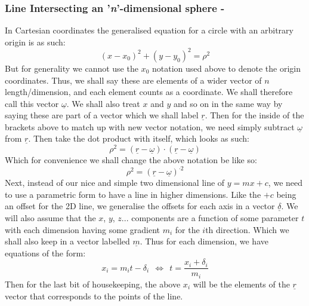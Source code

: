 \documentclass[a4paper,10pt]{article}
\begin{document}
\subsubsection{Line Intersecting an '\textit{n}'-dimensional sphere -}
In Cartesian coordinates the generalised equation for a circle with an arbitrary origin is as such:
\begin{equation}
\left( x - x_0 \right)^2 + \left( y - y_0 \right)^2 = \rho^2
\end{equation}
But for generality we cannot use the $x_0$ notation used above to denote the origin coordinates. Thus, we shall say these are elements of a wider vector of $n$ length/dimension, and each element counts as a coordinate. We shall therefore call this vector $\underline{\omega}$. We shall also treat $x$ and $y$ and so on in the same way by saying these are part of a vector which we shall label $\underline{r}$. Then for the inside of the brackets above to match up with new vector notation, we need simply subtract $\underline{\omega}$ from $\underline{r}$. Then take the dot product with itself, which looks as such:
\begin{equation}
\rho^2 = (\underline{r}-\underline{\omega}) \cdot (\underline{r}-\underline{\omega})
\end{equation}
Which for convenience we shall change the above notation be like so:
\begin{equation}
	\rho^2 = (\underline{r}-\underline{\omega})^{\cdot 2}
\end{equation}
Next, instead of our nice and simple two dimensional line of $y = mx + c$, we need to use a parametric form to have a line in higher dimensions. Like the $+c$ being an offset for the 2D line, we generalise the offsets for each axis in a vector $\underline{\delta}$. We will also assume that the $x$, $y$, $z$... components are a function of some parameter $t$ with each dimension having some gradient $m_i$ for the $i$th direction. Which we shall also keep in a vector labelled $\underline{m}$. Thus for each dimension, we have equations of the form:
\begin{equation}
x_i = m_i t - \delta_i \ \ \Leftrightarrow \ \ t = \frac{x_i + \delta_i}{m_i}
\end{equation}
Then for the last bit of housekeeping, the above $x_i$ will be the elements of the $\underline{r}$ vector that corresponds to the points of the line.
\end{document}
